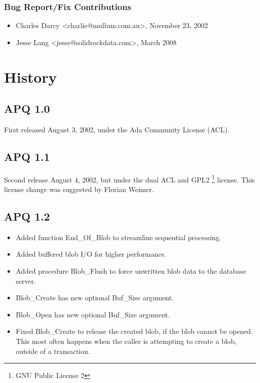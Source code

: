 \documentclass[english,letterpaper]{book}
\begin{document}
\subsection*{Bug Report/Fix Contributions}

\begin{itemize}
\item Charles Darcy <charlie@mullum.com.au>, November 23, 2002
\item Jesse Lang <jesse@solidrockdata.com>, March 2008
\end{itemize}

\chapter{History}


\section*{APQ 1.0}

First released August 3, 2002, under the Ada Community License (ACL).


\section*{APQ 1.1}

Second release August 4, 2002, but under the dual ACL and GPL2%
\footnote{GNU Public License 2%
} license. This license change was suggested by Florian Weimer.


\section*{APQ 1.2}

\begin{itemize}
   \item Added function End\_Of\_Blob to streamline sequential processing.
   \item Added buffered blob I/O for higher performance.
   \item Added procedure Blob\_Flush to force unwritten blob data to the database
         server.
   \item Blob\_Create has new optional Buf\_Size argument.
   \item Blob\_Open has new optional Buf\_Size argument.
   \item Fixed Blob\_Create to release the created blob, if the blob cannot
         be opened. This most often happens when the caller is attempting to
         create a blob, outside of a transaction.
\end{itemize}
\end{document}
